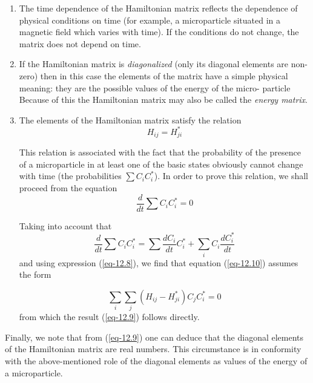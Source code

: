 \documentclass[a4paper,sfsidenotes,colorlinks=true]{tufte-book}
\numberwithin{equation}{section}
\numberwithin{figure}{section}
\begin{document}
\begin{enumerate}[leftmargin=1cm, label=(\arabic*)]
\item The time dependence of the Hamiltonian matrix reflects the
  dependence of physical conditions on time (for example, a
  microparticle situated in a magnetic field which varies with
  time). If the conditions do not change, the matrix does not depend
  on time.
\item If the Hamiltonian matrix is \emph{diagonalized} (only its
  diagonal elements are non-zero) then in this case the elements of
  the matrix have a simple physical meaning: they are the possible
  values of the energy of the micro- particle Because of this the Hamiltonian matrix may also
  be called the \emph{energy matrix}.
\item The elements of the Hamiltonian matrix satisfy the relation 
\begin{equation}%
H_{ij} = H_{ji}^{*}
\label{eq-12.9}
\end{equation}

This relation is associated with the fact that the probability of the
presence of a microparticle in at least one of the basic states
obviously cannot change with time (the probabilities $\sum 
C_{i}C_{i}^{*}$). In order to prove this relation, we shall proceed
from the equation
\begin{equation}%
\frac{d}{dt} \sum C_{i}C_{i}^{*} = 0
\label{eq-12.10}
\end{equation}

Taking into account that
\begin{equation}%
\frac{d}{dt} \sum C_{i}C_{i}^{*} = \sum \frac{d C_{i}}{dt} C_{i}^{*} +
\sum_{i} C_{i} \frac{d C_{i}^{*}}{dt} 
\label{eq-12.10}
\end{equation}
and using expression (\ref{eq-12.8}), we find that equation
(\ref{eq-12.10}) assumes the form

\begin{equation}%
\sum_{i}  \sum_{j} \left( H_{ij} - H_{ji}^{*} \right) C_{j}C_{i}^{*} = 0 
\label{eq-12.10}
\end{equation}
from which the result (\ref{eq-12.9}) follows directly. 
\end{enumerate}

Finally, we note that from (\ref{eq-12.9}) one can deduce that the
diagonal elements of the Hamiltonian matrix are real numbers. This
circumstance is in conformity with the above-mentioned role of the
diagonal elements as values of the energy of a microparticle.
\end{document}
